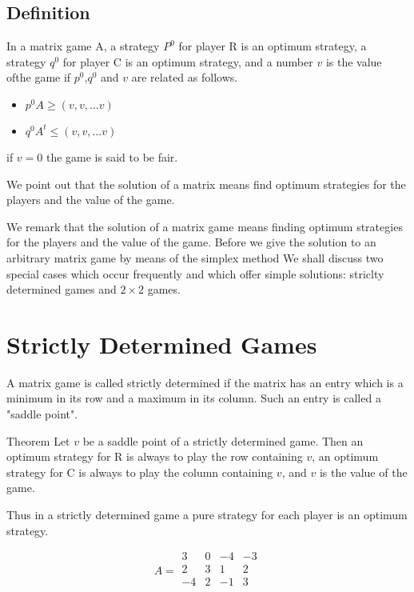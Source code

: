 \documentclass[]{report}
\begin{document}
\subsection{Definition}
In a matrix game A, a strategy $P^0$ for player R is an optimum strategy, a strategy $q^0$ for player C is an optimum strategy, and
a number $v$ is the value ofthe game if $p^0$,$q^0$ and $v$ are related as follows.
\begin{itemize}
\item $p^0A \geq (v,v,\ldots v)$
\item $q^0A^t \leq (v,v,\ldots v)$
\end{itemize}
if $v = 0$ the game is said to be fair.

We point out that  the solution of a matrix means find optimum strategies for the players and the value of the game.

We remark that the solution of a matrix game means finding optimum strategies for the players and the value of the game.
Before we give the solution to an arbitrary matrix game by means of the simplex method
We shall discuss two special cases which occur frequently and which offer simple solutions: striclty determined games and $2 \times 2$ games.

\section{Strictly Determined Games}

A matrix game is called strictly determined if the matrix has an entry which is a minimum in its row and a maximum in its column.
Such an entry is called a "saddle point".

Theorem Let $v$ be a saddle point of a strictly determined game. Then an optimum strategy for R is always to play the row 
containing $v$, an optimum strategy for C is always to play the column containing $v$, and $v$ is the value of the game.

Thus in a strictly determined game a pure strategy for each player is an optimum strategy.

\[
A = 
\begin{array}{cccc}
3 & 0 & -4 & -3 \\
2 & 3 & 1 & 2 \\
-4 & 2 & -1 & 3 \\
\end{array}
\]
\end{document}
